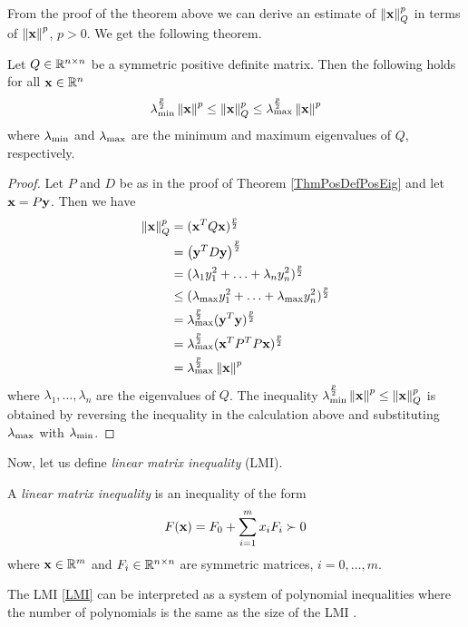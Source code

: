 \documentclass[a4paper,12pt,twoside,BCOR=10mm]{scrbook}
\begin{document}
From the proof of the theorem above we can derive an estimate of $\left\lVert\mathbf{x}\right\rVert_Q^p$ in terms of $\left\lVert\mathbf{x}\right\rVert_{}^{p}$, $p > 0$. We get the following theorem.

\begin{theorem}\label{Thm pnmorm norm relation}
Let $Q\in \mathbb{R}^{n\times n}$ be a symmetric positive definite matrix. Then the following holds for all $\mathbf{x} \in \mathbb{R}^{n}$
\begin{align*}
   \lambda_{\min}^\frac{p}{2} \left\lVert\mathbf{x}\right\rVert^p \leq \left\lVert\mathbf{x}\right\rVert_Q^p \leq \lambda_{\max}^\frac{p}{2} \left\lVert\mathbf{x}\right\rVert^p
\end{align*}
where $\lambda_{\min}$ and $\lambda_{\max}$ are the minimum and maximum eigenvalues of $Q$, respectively.
\end{theorem}
\begin{proof}
Let $P$ and $D$ be as in the proof of Theorem \ref{ThmPosDefPosEig} and let $\mathbf{x} = P\mathbf{y}$. Then we have
\begin{align*}
    \left\lVert\mathbf{x}\right\rVert_Q^p &= (\mathbf{x}^T Q \mathbf{x})^\frac{p}{2}\\
    &= \left (\mathbf{y}^T D \mathbf{y} \right)^\frac{p}{2}\\
    &= (\lambda_1 y_1^2 + \ldots + \lambda_n y_n^2)^\frac{p}{2}\\
    &\leq (\lambda_{\max} y_1^2 + \ldots + \lambda_{\max} y_n^2)^\frac{p}{2}\\
    &= \lambda_{\max}^\frac{p}{2} (\mathbf{y}^T \mathbf{y})^\frac{p}{2}\\
    &= \lambda_{\max}^\frac{p}{2} (\mathbf{x}^T P^TP\mathbf{x})^\frac{p}{2}\\
    &= \lambda_{\max}^\frac{p}{2} \left\lVert\mathbf{x}\right\rVert^p
\end{align*}
where $\lambda_1, \ldots, \lambda_n$ are the eigenvalues of $Q$. The inequality $\lambda_{\min}^\frac{p}{2}\left\lVert\mathbf{x}\right\rVert^p \leq \left\lVert\mathbf{x}\right\rVert_Q^p$ is obtained by reversing the inequality in the calculation above and substituting $\lambda_{\max}$ with $\lambda_{\min}$.
\end{proof}

Now, let us define \textit{linear matrix inequality} (LMI).

\begin{definition}\label{LMIdef}
A \textit{linear matrix inequality} is an inequality of the form
\begin{align}\label{LMI}
    F(\mathbf{x}) = F_0 + \sum\limits_{i=1}^m x_iF_i \succ 0
\end{align}
where $\mathbf{x}\in\mathbb{R}^{m}$ and $F_i \in \mathbb{R}^{n\times n}$ are symmetric matrices, $i = 0,\ldots, m$.
\end{definition}

The LMI \eqref{LMI} can be interpreted as a system of polynomial inequalities where the number of polynomials is the same as the size of the LMI \citep{vABr2000lmibmi}.
\end{document}
